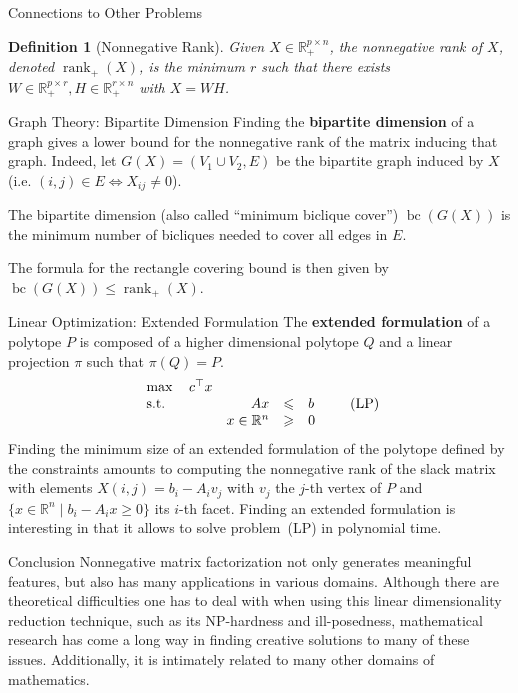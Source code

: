 \documentclass[final]{beamer}
\newlength{\onecolwid}
\newtheorem{defn}[thm]{Definition}
\newcommand{\real}{\mathbb{R}}
\DeclareMathOperator{\rank}{rank}
\DeclareMathOperator{\bc}{bc}
\begin{document}
\begin{frame}
\begin{columns}[t]
\begin{column}{\onecolwid}
\begin{exampleblock}{Connections to Other Problems}
\begin{defn}[Nonnegative Rank]
Given $X \in \real_+^{p\times n}$, the nonnegative rank of \(X\), denoted $\rank_+(X)$, is the minimum $r$ such that there exists $W \in \real_+^{p\times r}, H \in \real_+^{r\times n}$ with $X = WH$.
\end{defn}

\begin{block}{Graph Theory: Bipartite Dimension}
Finding the \textbf{bipartite dimension} of a graph gives a lower bound for the nonnegative rank of the matrix inducing that graph. Indeed, let $G(X) = (V_1 \cup V_2, E)$ be the bipartite graph induced by \(X\) (i.e. $(i,j)\in E \iff X_{ij}\neq 0$). 
    
The bipartite dimension (also called ``minimum biclique cover'') $\bc(G(X))$ is the minimum number of bicliques needed to cover all edges in \(E\).

The formula for the rectangle covering bound is then given by \(\bc(G(X)) \leqslant \rank_+(X)\).
\end{block}

\begin{block}{Linear Optimization: Extended Formulation}
The \textbf{extended formulation} of a polytope \(P\) is composed of a higher dimensional polytope \(Q\) and a linear projection $\pi$ such that $\pi(Q) = P$.
\[
\begin{array}{l@{\quad}rcl}
\max \quad c^\top x&&& \\
\textnormal{s.t.} & Ax & \leqslant & b\\
& x \in \real^n & \geqslant & 0
\end{array}
\tag{\textnormal{LP}}
\]
Finding the minimum size of an extended formulation of the polytope defined by the constraints amounts to computing the nonnegative rank of the slack matrix with elements $X(i,j) = b_i-A_iv_j$ with $v_j$ the $j$-th vertex of \(P\) and $\{x\in \real^n \mid b_i-A_ix\geqslant 0\}$ its $i$-th facet.
Finding an extended formulation is interesting in that it allows to solve problem~(LP) in polynomial time.
\end{block}

\end{exampleblock}

\begin{alertblock}{Conclusion}
Nonnegative matrix factorization not only generates meaningful features, but also has many applications in various domains. Although there are theoretical difficulties one has to deal with when using this linear dimensionality reduction technique, such as its NP-hardness and ill-posedness, mathematical research has come a long way in finding creative solutions to many of these issues.
Additionally, it is intimately related to many other domains of mathematics.
\end{alertblock}


\end{column}
\end{columns}
\end{frame}
\end{document}
